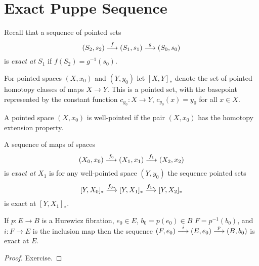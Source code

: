 

\chapter[Exact Puppe Sequence]{Exact Puppe Sequence}
\label{EXACT PUPPE SEQUENCE CHAPTER}
\thispagestyle{firststyle}

Recall that a sequence of pointed sets 
\[
(S_{2}, s_{2}) \overset{f}{\longrightarrow} (S_{1}, s_{1}) \overset{g}{\longrightarrow} (S_{0}, s_{0})
\]
is \emph{exact at $S_{1}$} if $f(S_{2}) = g^{-1}(s_{0})$. 


For pointed spaces $(X, x_{0})$ and $(Y, y_{0})$ let $[X, Y]_{\ast}$ denote the set of 
pointed homotopy classes of maps $X\to Y$. This is a pointed set, with the basepoint 
represented by the constant function $c_{y_{0}}\colon X \to Y$, $c_{y_{0}}(x) = y_{0}$
for all $x\in X$. 


\begin{definition}
A pointed space $(X, x_{0})$ is well-pointed if the pair $(X, x_{0})$ has the homotopy 
extension property.
\end{definition}


\begin{definition}
A sequence of maps of spaces 
\[
(X_{0}, x_{0}) \overset{f_{0}}{\longrightarrow} (X_{1}, x_{1}) \overset{f_{1}}{\longrightarrow} (X_{2}, x_{2})
\]
is \emph{exact at $X_{1}$} is for any well-pointed space $(Y, y_{0})$ the sequence 
pointed sets 
\[
[Y, X_{0}]_{\ast} \overset{f_{0\ast}}{\longrightarrow}
[Y, X_{1}]_{\ast} \overset{f_{1\ast}}{\longrightarrow}
[Y, X_{2}]_{\ast}
\]
is exact at $[Y, X_{1}]_{\ast}$.
\end{definition}


\begin{proposition}
If $p\colon E\to B$ is a Hurewicz fibration, $e_{0}\in E$, $b_{0} = p(e_{0})\in B$
$F = p^{-1}(b_{0})$, and $i\colon F \to E$ is the inclusion map 
then the sequence $(F, e_{0}) \overset{i}{\longrightarrow}  (E, e_{0}) 
\overset{p}{\longrightarrow} (B, b_{0})$ is exact at $E$.
\end{proposition}

\begin{proof}
Exercise.
\end{proof}

